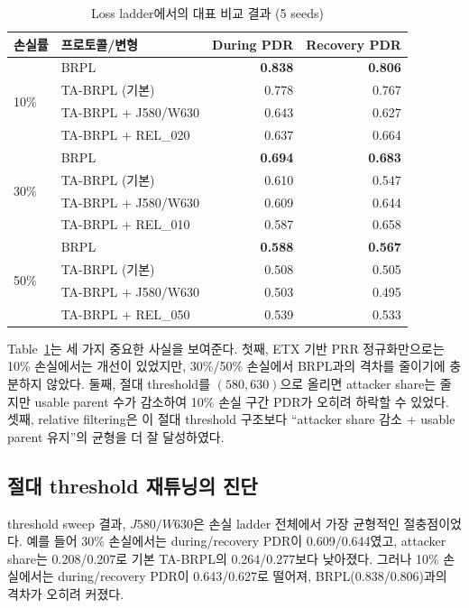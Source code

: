 \documentclass[12pt,a4paper]{article}
\begin{document}
\begin{table}[t]
  \centering
  \caption{Loss ladder에서의 대표 비교 결과 (5 seeds)}
  \label{tab:loss}
  \begin{tabular}{llrr}
    \toprule
    손실률 & 프로토콜/변형 & During PDR & Recovery PDR \\
    \midrule
    \multirow{4}{*}{10\%}
      & BRPL                         & \textbf{0.838} & \textbf{0.806} \\
      & TA-BRPL (기본)              & 0.778 & 0.767 \\
      & TA-BRPL + J580/W630         & 0.643 & 0.627 \\
      & TA-BRPL + REL\_020          & 0.637 & 0.664 \\
    \midrule
    \multirow{4}{*}{30\%}
      & BRPL                         & \textbf{0.694} & \textbf{0.683} \\
      & TA-BRPL (기본)              & 0.610 & 0.547 \\
      & TA-BRPL + J580/W630         & 0.609 & 0.644 \\
      & TA-BRPL + REL\_010          & 0.587 & 0.658 \\
    \midrule
    \multirow{4}{*}{50\%}
      & BRPL                         & \textbf{0.588} & \textbf{0.567} \\
      & TA-BRPL (기본)              & 0.508 & 0.505 \\
      & TA-BRPL + J580/W630         & 0.503 & 0.495 \\
      & TA-BRPL + REL\_050          & 0.539 & 0.533 \\
    \bottomrule
  \end{tabular}
\end{table}

Table~\ref{tab:loss}는 세 가지 중요한 사실을 보여준다.
첫째, ETX 기반 PRR 정규화만으로는 10\% 손실에서는 개선이 있었지만,
30\%/50\% 손실에서 BRPL과의 격차를 줄이기에 충분하지 않았다.
둘째, 절대 threshold를 $(580,630)$으로 올리면 attacker share는 줄지만
usable parent 수가 감소하여 10\% 손실 구간 PDR가 오히려 하락할 수 있었다.
셋째, relative filtering은 이 절대 threshold 구조보다
``attacker share 감소 + usable parent 유지''의 균형을 더 잘 달성하였다.

\subsection{절대 threshold 재튜닝의 진단}

threshold sweep 결과, $J580/W630$은 손실 ladder 전체에서 가장 균형적인 절충점이었다.
예를 들어 30\% 손실에서는 during/recovery PDR이 0.609/0.644였고,
attacker share는 0.208/0.207로 기본 TA-BRPL의 0.264/0.277보다 낮아졌다.
그러나 10\% 손실에서는 during/recovery PDR이 0.643/0.627로 떨어져,
BRPL(0.838/0.806)과의 격차가 오히려 커졌다.
\end{document}
